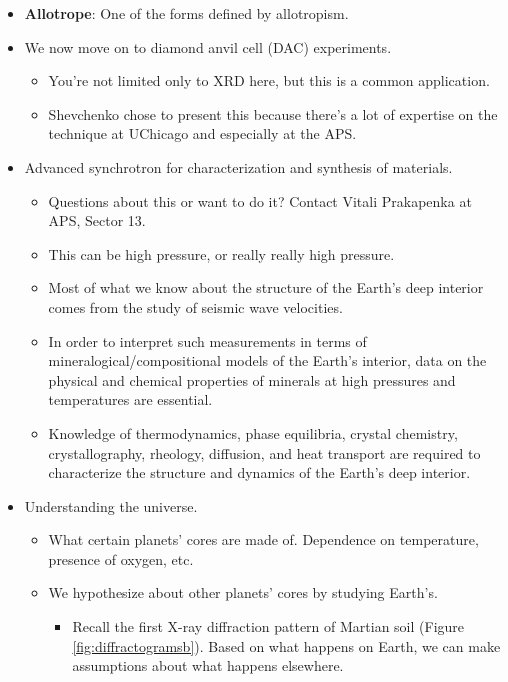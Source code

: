\documentclass[../notes.tex]{subfiles}
\begin{document}
\begin{itemize}
\begin{itemize}
    \end{itemize}
    \item \textbf{Allotrope}: One of the forms defined by allotropism.
    \item We now move on to diamond anvil cell (DAC) experiments.
    \begin{itemize}
        \item You're not limited only to XRD here, but this is a common application.
        \item Shevchenko chose to present this because there's a lot of expertise on the technique at UChicago and especially at the APS.
    \end{itemize}
    \item Advanced synchrotron for characterization and synthesis of materials.
    \begin{itemize}
        \item Questions about this or want to do it? Contact Vitali Prakapenka at APS, Sector 13.
        \item This can be high pressure, or really really high pressure.
        \item Most of what we know about the structure of the Earth's deep interior comes from the study of seismic wave velocities.
        \item In order to interpret such measurements in terms of mineralogical/compositional models of the Earth's interior, data on the physical and chemical properties of minerals at high pressures and temperatures are essential.
        \item Knowledge of thermodynamics, phase equilibria, crystal chemistry, crystallography, rheology, diffusion, and heat transport are required to characterize the structure and dynamics of the Earth's deep interior.
    \end{itemize}
    \item Understanding the universe.
    \begin{itemize}
        \item What certain planets' cores are made of. Dependence on temperature, presence of oxygen, etc.
        \item We hypothesize about other planets' cores by studying Earth's.
        \begin{itemize}
            \item Recall the first X-ray diffraction pattern of Martian soil (Figure \ref{fig:diffractogramsb}). Based on what happens on Earth, we can make assumptions about what happens elsewhere.
        \end{itemize}

\end{itemize}
\end{itemize}
\end{document}
